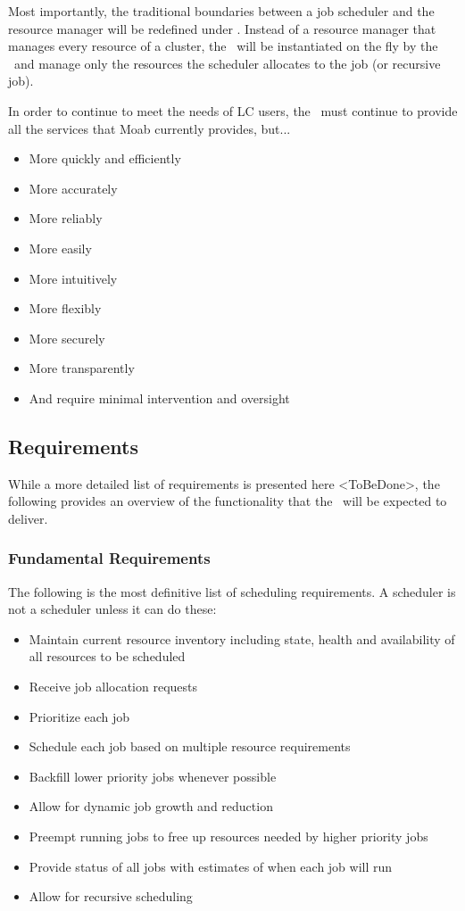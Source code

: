 Most importantly, the traditional boundaries between a job scheduler
and the resource manager will be redefined under \ngrm.  Instead of a
resource manager that manages every resource of a cluster, the
\ngrmfull\ will be instantiated on the fly by the \ngjs\ and manage
only the resources the scheduler allocates to the job (or recursive
job).

In order to continue to meet the needs of LC users, the \ngjs\ must
continue to provide all the services that Moab currently provides,
but...
\begin{itemize}
  \item More quickly and efficiently
  \item More accurately
  \item More reliably
  \item More easily
  \item More intuitively
  \item More flexibly
  \item More securely
  \item More transparently
  \item And require minimal intervention and oversight
\end{itemize}

\subsection{Requirements}

While a more detailed list of requirements is presented here
<ToBeDone>, the following provides an overview of the functionality
that the \ngjs\ will be expected to deliver.

\subsubsection{Fundamental Requirements}

The following is the most definitive list of scheduling requirements.
A scheduler is not a scheduler unless it can do these:

\begin{itemize}
  \item Maintain current resource inventory including state, health
    and availability of all resources to be scheduled
  \item Receive job allocation requests
  \item Prioritize each job
  \item Schedule each job based on multiple resource requirements
  \item Backfill lower priority jobs whenever possible
  \item Allow for dynamic job growth and reduction
  \item Preempt running jobs to free up resources needed by higher priority jobs
  \item Provide status of all jobs with estimates of when each job will run
  \item Allow for recursive scheduling
\end{itemize}

